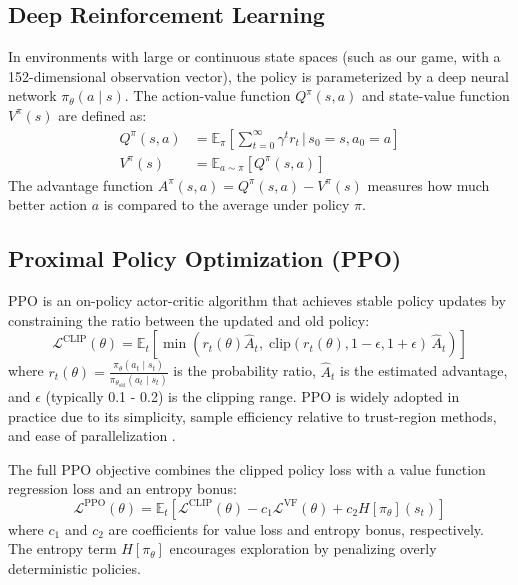 \subsection{Deep Reinforcement Learning}

In environments with large or continuous state spaces (such as our game, with a 152-dimensional observation vector), the policy is parameterized by a deep neural network $\pi_\theta(a \mid s)$. The action-value function $Q^\pi(s, a)$ and state-value function $V^\pi(s)$ are defined as:
\begin{align}
Q^\pi(s, a) &= \mathbb{E}_\pi \left[ \sum_{t=0}^{\infty} \gamma^t r_t \,\Big|\, s_0=s, a_0=a \right] \\
V^\pi(s) &= \mathbb{E}_{a \sim \pi} \left[ Q^\pi(s, a) \right]
\end{align}
The advantage function $A^\pi(s, a) = Q^\pi(s, a) - V^\pi(s)$ measures how much better action $a$ is compared to the average under policy $\pi$.

\subsection{Proximal Policy Optimization (PPO)}

PPO \cite{schulman2017proximal} is an on-policy actor-critic algorithm that achieves stable policy updates by constraining the ratio between the updated and old policy:
\begin{equation}
\mathcal{L}^{\text{CLIP}}(\theta) = \mathbb{E}_t \left[ \min\!\left( r_t(\theta) \hat{A}_t,\; \text{clip}(r_t(\theta), 1-\epsilon, 1+\epsilon)\, \hat{A}_t \right) \right]
\label{eq:ppo_clip}
\end{equation}
where $r_t(\theta) = \frac{\pi_\theta(a_t \mid s_t)}{\pi_{\theta_\text{old}}(a_t \mid s_t)}$ is the probability ratio, $\hat{A}_t$ is the estimated advantage, and $\epsilon$ (typically 0.1 - 0.2) is the clipping range. PPO is widely adopted in practice due to its simplicity, sample efficiency relative to trust-region methods, and ease of parallelization \cite{schulman2017proximal}.

The full PPO objective combines the clipped policy loss with a value function regression loss and an entropy bonus:
\begin{equation}
\mathcal{L}^{\text{PPO}}(\theta) = \mathbb{E}_t \left[ \mathcal{L}^{\text{CLIP}}(\theta) - c_1 \mathcal{L}^{\text{VF}}(\theta) + c_2 H[\pi_\theta](s_t) \right]
\label{eq:ppo_full}
\end{equation}
where $c_1$ and $c_2$ are coefficients for value loss and entropy bonus, respectively. The entropy term $H[\pi_\theta]$ encourages exploration by penalizing overly deterministic policies.

